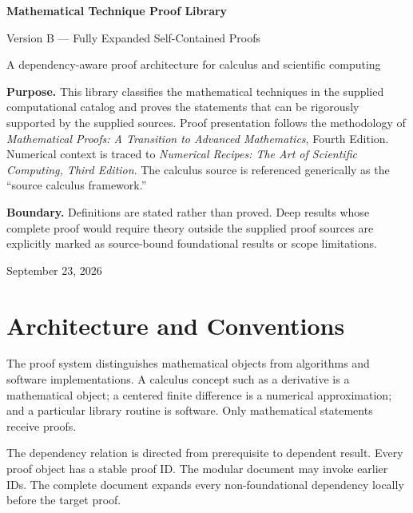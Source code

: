 \documentclass[10pt]{article}
\newcommand{\nr}{\emph{Numerical Recipes: The Art of Scientific Computing, Third Edition}}
\theoremstyle{definition}
\theoremstyle{remark}
\begin{document}
\hypersetup{pageanchor=false}

\begin{titlepage}
\centering
\vspace*{1.1in}
{\Huge\bfseries\color{navy} Mathematical Technique Proof Library\par}
\vspace{0.25in}
{\Large\color{blue} Version B --- Fully Expanded Self-Contained Proofs\par}
\vspace{0.5in}
{\large A dependency-aware proof architecture for calculus and scientific computing\par}
\vfill
\begin{minipage}{0.84\textwidth}
\small
\textbf{Purpose.} This library classifies the mathematical techniques in the supplied
computational catalog and proves the statements that can be rigorously supported by the
supplied sources. Proof presentation follows the methodology of
\emph{Mathematical Proofs: A Transition to Advanced Mathematics}, Fourth Edition.
Numerical context is traced to \nr. The calculus source is referenced generically as the
``source calculus framework.''

\medskip
\textbf{Boundary.} Definitions are stated rather than proved. Deep results whose complete
proof would require theory outside the supplied proof sources are explicitly marked as
source-bound foundational results or scope limitations.
\end{minipage}
\vfill
{\large September 23, 2026\par}
\end{titlepage}

\clearpage
\hypersetup{pageanchor=true}
\tableofcontents
\clearpage
{}

\section{Architecture and Conventions}

The proof system distinguishes mathematical objects from algorithms and software implementations.
A calculus concept such as a derivative is a mathematical object; a centered finite difference is a
numerical approximation; and a particular library routine is software. Only mathematical statements
receive proofs.

The dependency relation is directed from prerequisite to dependent result. Every proof object has a
stable proof ID. The modular document may invoke earlier IDs. The complete document expands every
non-foundational dependency locally before the target proof.
\end{document}
